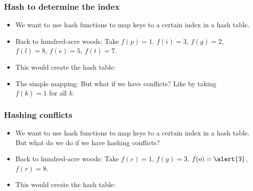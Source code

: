\begin{frame}
	\frametitle{Hash to determine the index}

		\begin{itemize}
			\item We want to use hash functions to map keys to a certain index in a hash table.
			\item Back to hundred-acre woods:
		Take $f(p) = 1$, $f(i) = 3$, $f(g) = 2$, $f(l) = 8$, $f(e) = 5$, $f(t) = 7$.
		
			\item This would create the hash table:
		\begin{center}
		\scriptsize
			
		\end{center}
\item The simple mapping:
		But what if we have conflicts? Like by taking $f(k)=1$ for all $k$.
	\end{itemize}	
\end{frame}

\begin{frame}
	\frametitle{Hashing conflicts}

		\begin{itemize}
			\item We want to use hash functions to map keys to a certain index in a hash table.\\
		But what do we do if we have hashing conflicts?
			\item Back to hundred-acre woods:
		Take $f(e) = 1$, $f(y) = 3$, $f(o) = \alert{3}$, $f(r) = 8$.
		
			\item This would create the hash table:
		\begin{center}
		\scriptsize
			
		\end{center}
	\end{itemize}	
\end{frame}

